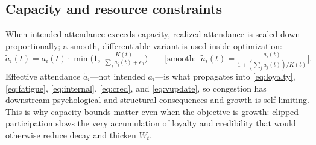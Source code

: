 \documentclass[11pt]{article}
\begin{document}
\subsection{Capacity and resource constraints}\label{sec:capacity}
When intended attendance exceeds capacity, realized attendance is scaled down proportionally; a smooth, differentiable variant is used inside optimization:
\begin{equation}\tag{12}\label{eq:capacity}
\tilde a_i(t)=a_i(t)\cdot\min\!\Big(1,\ \tfrac{K(t)}{\sum_j a_j(t)+\epsilon_0}\Big)
\qquad\Big[\text{smooth: }\ \tilde a_i(t)=\tfrac{a_i(t)}{1+(\sum_j a_j(t))/K(t)}\Big].
\end{equation}
Effective attendance $\tilde a_i$---not intended $a_i$---is what propagates into \eqref{eq:loyalty}, \eqref{eq:fatigue}, \eqref{eq:internal}, \eqref{eq:cred}, and \eqref{eq:vupdate}, so congestion has downstream psychological and structural consequences and growth is self-limiting. This is why capacity bounds matter even when the objective is growth: clipped participation slows the very accumulation of loyalty and credibility that would otherwise reduce decay and thicken $W_t$.
\end{document}
